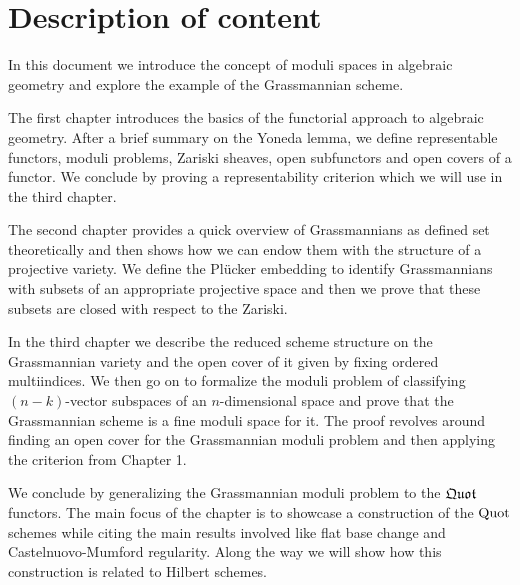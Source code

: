\section*{Description of content}
In this document we introduce the concept of moduli spaces in algebraic geometry and explore the example of the Grassmannian scheme.\medskip

The first chapter introduces the basics of the functorial approach to algebraic geometry. After a brief summary on the Yoneda lemma, we define representable functors, moduli problems, Zariski sheaves, open subfunctors and open covers of a functor. We conclude by proving a representability criterion which we will use in the third chapter.\smallskip

The second chapter provides a quick overview of Grassmannians as defined set theoretically and then shows how we can endow them with the structure of a projective variety. We define the Pl\"ucker embedding to identify Grassmannians with subsets of an appropriate projective space and then we prove that these subsets are closed with respect to the Zariski.\smallskip

In the third chapter we describe the reduced scheme structure on the Grassmannian variety and the open cover of it given by fixing ordered multiindices. We then go on to formalize the moduli problem of classifying $(n-k)$-vector subspaces of an $n$-dimensional space and prove that the Grassmannian scheme is a fine moduli space for it. The proof revolves around finding an open cover for the Grassmannian moduli problem and then applying the criterion from Chapter 1.\smallskip

We conclude by generalizing the Grassmannian moduli problem to the $\mathfrak{Quot}$ functors. The main focus of the chapter is to showcase a construction of the $\mathrm{Quot}$ schemes while citing the main results involved like flat base change and Castelnuovo-Mumford regularity. Along the way we will show how this construction is related to Hilbert schemes.